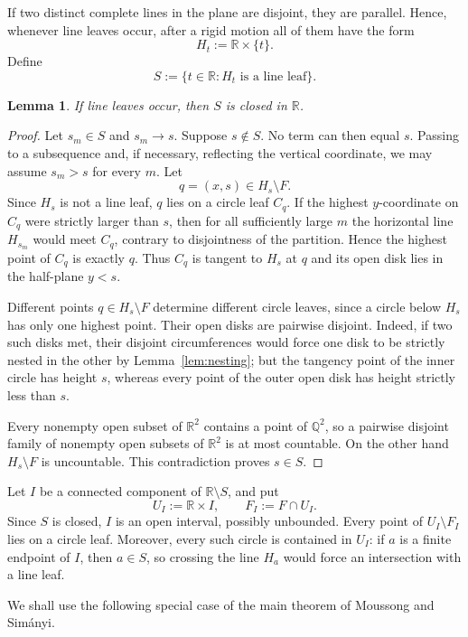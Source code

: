 \documentclass[11pt]{article}
\newtheorem{lemma}[theorem]{Lemma}
\newcommand{\R}{\mathbb{R}}
\begin{document}
If two distinct complete lines in the plane are disjoint, they are parallel. Hence, whenever line leaves occur, after a rigid motion all of them have the form
\[
H_t:=\R\times\{t\}.
\]
Define
\[
S:=\{t\in\R:H_t\text{ is a line leaf}\}.
\]

\begin{lemma}\label{lem:Sclosed}
If line leaves occur, then $S$ is closed in $\R$.
\end{lemma}

\begin{proof}
Let $s_m\in S$ and $s_m\to s$. Suppose $s\notin S$. No term can then equal $s$. Passing to a subsequence and, if necessary, reflecting the vertical coordinate, we may assume $s_m>s$ for every $m$. Let
\[
q=(x,s)\in H_s\setminus F.
\]
Since $H_s$ is not a line leaf, $q$ lies on a circle leaf $C_q$. If the highest $y$-coordinate on $C_q$ were strictly larger than $s$, then for all sufficiently large $m$ the horizontal line $H_{s_m}$ would meet $C_q$, contrary to disjointness of the partition. Hence the highest point of $C_q$ is exactly $q$. Thus $C_q$ is tangent to $H_s$ at $q$ and its open disk lies in the half-plane $y<s$.

Different points $q\in H_s\setminus F$ determine different circle leaves, since a circle below $H_s$ has only one highest point. Their open disks are pairwise disjoint. Indeed, if two such disks met, their disjoint circumferences would force one disk to be strictly nested in the other by Lemma~\ref{lem:nesting}; but the tangency point of the inner circle has height $s$, whereas every point of the outer open disk has height strictly less than $s$.

Every nonempty open subset of $\R^2$ contains a point of $\mathbb Q^2$, so a pairwise disjoint family of nonempty open subsets of $\R^2$ is at most countable. On the other hand $H_s\setminus F$ is uncountable. This contradiction proves $s\in S$.
\end{proof}

Let $I$ be a connected component of $\R\setminus S$, and put
\[
U_I:=\R\times I,
\qquad
F_I:=F\cap U_I.
\]
Since $S$ is closed, $I$ is an open interval, possibly unbounded. Every point of $U_I\setminus F_I$ lies on a circle leaf. Moreover, every such circle is contained in $U_I$: if $a$ is a finite endpoint of $I$, then $a\in S$, so crossing the line $H_a$ would force an intersection with a line leaf.

We shall use the following special case of the main theorem of Moussong and Sim\'anyi.
\end{document}
